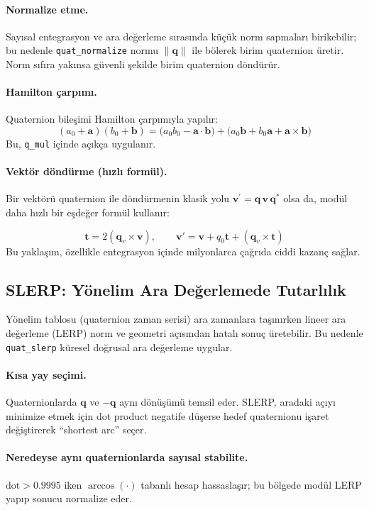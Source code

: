 \paragraph{Normalize etme.}
Sayısal entegrasyon ve ara değerleme sırasında küçük norm sapmaları birikebilir; bu nedenle \texttt{quat\_normalize} normu \( \|\mathbf{q}\| \) ile bölerek birim quaternion üretir. Norm sıfıra yakınsa güvenli şekilde birim quaternion döndürür. 

\paragraph{Hamilton çarpımı.}
Quaternion bileşimi Hamilton çarpımıyla yapılır:
\[
(a_0+\mathbf{a})(b_0+\mathbf{b})=
\bigl(a_0b_0-\mathbf{a}\cdot\mathbf{b}\bigr) + \bigl(a_0\mathbf{b}+b_0\mathbf{a}+\mathbf{a}\times\mathbf{b}\bigr)
\]
Bu, \texttt{q\_mul} içinde açıkça uygulanır. 

\paragraph{Vektör döndürme (hızlı formül).}
Bir vektörü quaternion ile döndürmenin klasik yolu
\(\mathbf{v}^{\prime} = \mathbf{q}\,\mathbf{v}\,\mathbf{q}^{\ast}\)
olsa da, modül daha hızlı bir eşdeğer formül kullanır:

\[
\mathbf{t}=2(\mathbf{q}_v\times \mathbf{v}),\qquad
\mathbf{v}'=\mathbf{v}+q_0\mathbf{t}+(\mathbf{q}_v\times \mathbf{t})
\]
Bu yaklaşım, özellikle entegrasyon içinde milyonlarca çağrıda ciddi kazanç sağlar.

\subsection*{SLERP: Yönelim Ara Değerlemede Tutarlılık}
Yönelim tablosu (quaternion zaman serisi) ara zamanlara taşınırken lineer ara değerleme (LERP) norm ve geometri açısından hatalı sonuç üretebilir. Bu nedenle \texttt{quat\_slerp} küresel doğrusal ara değerleme uygular.

\paragraph{Kısa yay seçimi.}
Quaternionlarda \(\mathbf{q}\) ve \(-\mathbf{q}\) aynı dönüşümü temsil eder. SLERP, aradaki açıyı minimize etmek için dot product negatife düşerse hedef quaternionu işaret değiştirerek ``shortest arc'' seçer. 

\paragraph{Neredeyse aynı quaternionlarda sayısal stabilite.}
\(\text{dot} > 0.9995\) iken \(\arccos(\cdot)\) tabanlı hesap hassaslaşır; bu bölgede modül LERP yapıp sonucu normalize eder. 

